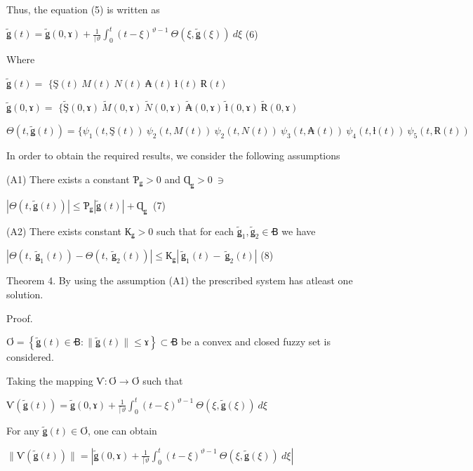 \documentclass[
]{article}
\begin{document}
Thus, the equation (5) is written as

\(\widetilde{ǥ}(t) = \widetilde{ǥ}(0,ɤ) + \frac{1}{\lceil\vartheta}\int_{0}^{t}{}(t - \xi)^{\vartheta - 1}\ \Theta\left( \xi,\widetilde{ǥ}(\xi) \right)\ d\xi\) (6)

Where

\(\widetilde{ǥ}(t) =\) \(\{ Ş(t)\ M(t)\ N(t)\ ₳(t)\ ƚ(t)\ Ɍ(t)\ \)

\(\widetilde{ǥ}(0,ɤ) =\) \(\{\widetilde{Ş}(0,ɤ)\ \widetilde{M}(0,ɤ)\ \widetilde{N}(0,ɤ)\ \widetilde{₳}(0,ɤ)\ \widetilde{ƚ}(0,ɤ)\ \widetilde{Ɍ}(0,ɤ)\ \)

\(\Theta\left( t,\widetilde{ǥ}(t) \right) = \{\psi_{1}\left( t,Ş(t) \right)\ \psi_{2}\left( t,M(t) \right)\ \psi_{2}\left( t,N(t) \right)\ \psi_{3}\left( t,₳(t) \right)\ \psi_{4}\left( t,ƚ(t) \right)\ \psi_{5}\left( t,Ɍ(t) \right)\ \)

In order to obtain the required results, we consider the following assumptions

(A1) There exists a constant \(Ƥ_{ǥ} > 0\) and \(Ɋ_{ǥ} > 0\  \ni \ \)

\(\left| \Theta\left( t,\widetilde{ǥ}(t) \right) \right| \leq Ƥ_{ǥ}\left| \widetilde{ǥ}(t) \right| + Ɋ_{ǥ}\ \) (7)

(A2) There exists constant \(К_{ǥ} > 0\) such that for each \({\widetilde{ǥ}}_{1},{\widetilde{ǥ}}_{2} \in Ꞗ\) we have

\(\left| \Theta\left( t,\ {\widetilde{ǥ}}_{1}(t) \right) - \Theta\left( t,\ {\widetilde{ǥ}}_{2}(t) \right) \right| \leq К_{ǥ}\left| \ {\widetilde{ǥ}}_{1}(t) - \ {\widetilde{ǥ}}_{2}(t) \right|\) (8)

Theorem 4. By using the assumption (A1) the prescribed system has atleast one solution.

Proof.

\(Ơ = \left\{ \widetilde{ǥ}(t) \in Ꞗ:\|\widetilde{ǥ}(t)\| \leq ɤ \right\} \subset Ꞗ\) be a convex and closed fuzzy set is considered.

Taking the mapping \(Ѵ:Ơ \rightarrow Ơ\) such that

\(Ѵ\left( \widetilde{ǥ}(t) \right) = \widetilde{ǥ}(0,ɤ) + \frac{1}{\lceil\vartheta}\int_{0}^{t}{}(t - \xi)^{\vartheta - 1}\ \Theta\left( \xi,\widetilde{ǥ}(\xi) \right)\ d\xi\)

For any \(\widetilde{ǥ}(t) \in Ơ\), one can obtain

\(\| Ѵ\left( \widetilde{ǥ}(t) \right)\| = \left| \widetilde{ǥ}(0,ɤ) + \frac{1}{\lceil\vartheta}\int_{0}^{t}{}(t - \xi)^{\vartheta - 1}\ \Theta\left( \xi,\widetilde{ǥ}(\xi) \right)\ d\xi \right|\ \)
\end{document}
